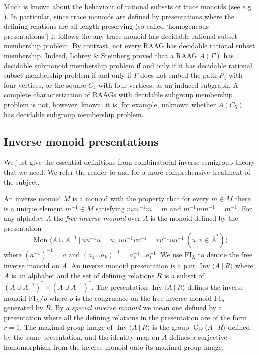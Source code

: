 \documentclass{amsart}
\newcommand{\Mpres}[2]{\operatorname{Mon}\bigl\langle #1\:|\:#2 \bigr\rangle}
\newcommand{\Gpres}[2]{\operatorname{Gp}\bigl\langle #1\:|\:#2 \bigr\rangle}
\newcommand{\Ipres}[2]{\operatorname{Inv}\bigl\langle #1\:|\:#2 \bigr\rangle}
\theoremstyle{plain}
\theoremstyle{definition}
\begin{document}
Much is known about the behaviour of rational subsets of trace monoids (see e.g. \cite{Diekert1990}). In particular, since trace monoids are defined by presentations where the defining relations are all length preserving (so called `homogeneous presentations') it follows the any trace monoid has decidable rational subset membership problem. By contrast, not every RAAG has decidable rational subset membership. Indeed, Lohrey \& Steinberg \cite{Lohrey2008} proved that a RAAG $A(\Gamma)$ has decidable submonoid membership problem if and only if it has decidable rational subset membership problem if and only if $\Gamma$ does not embed the path $P_4$ with four vertices, or the square $C_4$ with four vertices, as an induced subgraph. A complete characterization of RAAGs with decidable subgroup membership problem is not, however, known; it is, for example, unknown whether $A(C_5)$ has decidable subgroup membership problem. 


\subsection*{Inverse monoid presentations}

We just give the essential definitions from combinatorial inverse semigroup theory that we need. We refer the reader to \cite{Meakin2020} and \cite{Lawson1998} for a more comprehensive treatment of the subject.  

An inverse monoid $M$ is a monoid with the property that for every $m \in M$ there is a unique element $m^{-1} \in M$ satisfying $mm^{-1}m=m$ and $m^{-1}mm^{-1}=m^{-1}$.   
For any alphabet $A$ the \emph{free inverse monoid} over $A$ is the monoid defined by the presentation   
\[
\Mpres{A \cup A^{-1}}{uu^{-1}u=u,\ uu^{-1}vv^{-1}=vv^{-1}uu^{-1}\ (u,v\in\overline{A}^\ast)}
\]
where $(a^{-1})^{-1} = a$ and $(a_1 \ldots a_k)^{-1} = a_k^{-1} \ldots a_1^{-1}$.  
We use $\mathrm{FI_A}$ to denote the free inverse monoid on $A$.   
An inverse monoid presentation is a pair $\Ipres{A}{R}$ where $A$ is an alphabet and the set of defining relations $R$ is a subset of $(A \cup A^{-1})^\ast \times (A \cup A^{-1})^\ast$. 
The presentation $\Ipres{A}{R}$ defines the inverse monoid $\mathrm{FI_A}/\rho$ where $\rho$ is the congruence on the free inverse monoid $\mathrm{FI_A}$ generated by $R$. 
By a \emph{special inverse monoid} we mean one defined by a presentation where all the defining relations in the presentation are of the form $r=1$.  
The maximal group image of $\Ipres{A}{R}$ is the group $\Gpres{A}{R}$ defined by the same presentation, and the identity map on $A$ defines a surjective homomorphism from the inverse monoid onto its maximal group image.   
\end{document}
